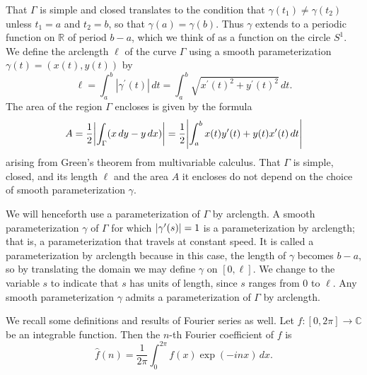 \documentclass[11pt,leqno]{article}
\theoremstyle{plain}
\theoremstyle{definition}
\numberwithin{equation}{section}
\numberwithin{lem}{section}
\begin{document}
That $\Gamma$ is simple and closed translates to the condition that $\gamma(t_1)\neq \gamma(t_2)$ unless $t_1 = a$ and $t_2 = b$, so that $\gamma(a) = \gamma(b)$. Thus $\gamma$ extends to a periodic function on $\mathbb R$ of period $b-a$, which we think of as a function on the circle $S^1$. We define the arclength $\ell$ of the curve $\Gamma$ using a smooth parameterization $\gamma(t) = (x(t),y(t))$ by 
\[\ell = \int_a^b |\gamma^\prime(t)| \,dt = \int_a^b \sqrt{x^\prime(t)^2 + y^\prime(t)^2}\,dt.\] The area of the region $\Gamma$ encloses is given by the formula 
\[A = \frac{1}{2}\abs{\int_\Gamma(x\,dy - y \,dx)} = \frac{1}{2}\abs{\int_a^b x(t)y^\prime(t) + y(t)x^\prime(t)\,dt}\]
arising from Green's theorem from multivariable calculus. That $\Gamma$ is simple, closed, and its length $\ell$ and the area $A$ it encloses do not depend on the choice of smooth parameterization $\gamma$.

We will henceforth use a parameterization of $\Gamma$ by arclength. A smooth parameterization $\gamma$ of $\Gamma$ for which $\abs{\gamma^\prime(s)} = 1$ is a parameterization by arclength; that is, a parameterization that travels at constant speed. It is called a parameterization by arclength because in this case, the length of $\gamma$ becomes $b-a$, so by translating the domain we may define $\gamma$ on $[0,\ell]$. We change to the variable $s$ to indicate that $s$ has units of length, since $s$ ranges from $0$ to $\ell$. Any smooth parameterization $\gamma$ admits a parameterization of $\Gamma$ by arclength.

We recall some definitions and results of Fourier series as well. Let $f\colon [0,2\pi]\to\mathbb C$ be an integrable function. Then the $n$-th Fourier coefficient of $f$ is 
\[\hat f(n) = \frac{1}{2\pi}\int_0^{2\pi}f(x)\exp(-inx)\,dx.\]
\end{document}
